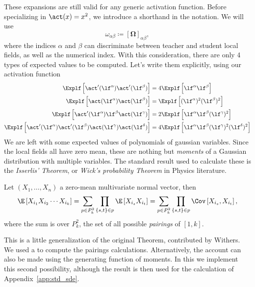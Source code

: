 These expansions are still valid for any generic activation function.
Before specializing in \(\act(x)=x^2\), we introduce a shorthand in the notation.
We will use \[\omega_{\alpha\beta} \coloneqq \left[\bm{\Omega}\right]_{\alpha\beta},\]
where the indices \(\alpha\) and \(\beta\) can discriminate between teacher and student local fields, as well as the numerical index.
With this consideration, there are only 4 types of expected values to be computed.
Let's write them explicitly, using our activation function
\[\begin{split}
  \Explf  \left[\act' (\lf^\alpha)  \act' (\lf^\beta)  \right] &= 
  4 \Explf  \left[\lf^\alpha \lf^\beta \right] \\
  \Explf  \left[\act(\lf^\alpha)  \act(\lf^\beta)  \right] &= 
  \Explf  \left[(\lf^\alpha)^2 (\lf^\beta)^2 \right] \\
  \Explf  \left[\act'(\lf^\alpha) \lf^\beta \act(\lf^\gamma) \right] &= 
  2\Explf  \left[\lf^\alpha \lf^\beta (\lf^\gamma)^2\right] \\
  \Explf  \left[\act'(\lf^\alpha) \act'(\lf^\beta) \act(\lf^\gamma) \act(\lf^\delta) \right] &= 
  4\Explf  \left[\lf^\alpha \lf^\beta (\lf^\gamma)^2 (\lf^\delta)^2\right] \\
\end{split}\]
We are left with some expected values of polynomials of gaussian variables. 
Since the local fields all have zero mean, these are nothing but \emph{moments} 
of a Gaussian distribution with multiple variables.
The standard result used to calculate these is the \emph{Isserlis' Theorem}, or 
\emph{Wick's probability Theorem} in Physics literature.
\begin{Theorem}
  Let \((X_1,\dots,X_n)\) a zero-mean multivariate normal vector,
  then
  \[
    \E\left[X_{i_1}X_{i_2}\cdots X_{i_k}\right] =
      \sum_{p\in P^2_k}\prod_{\{s,t\}\in p} \E\left[X_{i_s}X_{i_t}\right] =
      \sum_{p\in P^2_k}\prod_{\{s,t\}\in p} \Cov\left[X_{i_s},X_{i_t}\right],
  \]
  where the sum is over \(P^2_k\), the set of all possible \emph{pairings} of \([1,k]\).
\end{Theorem}
This is a little generalization of the original Theorem, contributed by Withers\cite{withers1985moments}.
We used a  to compute the pairings calculations.
Alternatively, the account can also be made using the generating function of moments.
In this  we implement this second possibility, 
although the result is then used for the calculation of Appendix~\ref{app:std_sde}.


